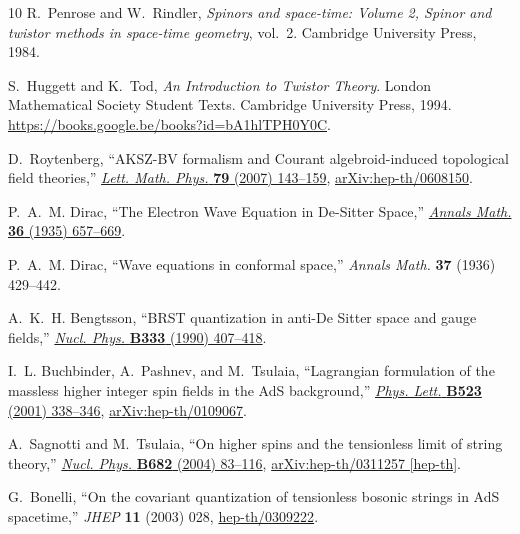 \documentclass[a4paper,12pt]{article}
\numberwithin{equation}{section} %
\numberwithin{equation}{section}
\begin{document}
\begin{thebibliography}{10}
R.~Penrose and W.~Rindler, {\em Spinors and space-time: Volume 2, Spinor and twistor methods in space-time geometry}, vol.~2.
\newblock Cambridge University Press, 1984.

S.~Huggett and K.~Tod, {\em An Introduction to Twistor Theory}.
\newblock London Mathematical Society Student Texts. Cambridge University Press, 1994.
\newblock \url{https://books.google.be/books?id=bA1hlTPH0Y0C}.

D.~Roytenberg, ``{AKSZ}-{BV} formalism and {C}ourant algebroid-induced topological field theories,'' \href{http://dx.doi.org/10.1007/s11005-006-0134-y}{{\em Lett. Math. Phys.} {\bfseries 79} (2007) 143--159},
\href{http://arxiv.org/abs/hep-th/0608150}{{\ttfamily arXiv:hep-th/0608150}}.

P.~A.~M. Dirac, ``{The Electron Wave Equation in De-Sitter Space},'' \href{http://dx.doi.org/10.2307/1968649}{{\em Annals Math.} {\bfseries 36} (1935) 657--669}.

P.~A.~M. Dirac, ``{W}ave equations in conformal space,''
{\em Annals Math.} {\bfseries 37} (1936) 429--442.

A.~K.~H. Bengtsson, ``{BRST quantization in anti-De Sitter space and gauge fields},''
\href{http://dx.doi.org/10.1016/0550-3213(90)90044-E}{{\em Nucl. Phys.} {\bfseries B333} (1990) 407--418}.

I.~L. Buchbinder, A.~Pashnev, and M.~Tsulaia, ``{L}agrangian formulation of the massless higher integer spin fields in the {A}d{S} background,'' \href{http://dx.doi.org/10.1016/S0370-2693(01)01268-0}{{\em Phys. Lett.} {\bfseries B523} (2001) 338--346},
\href{http://arxiv.org/abs/hep-th/0109067}{{\ttfamily arXiv:hep-th/0109067}}.

A.~Sagnotti and M.~Tsulaia, ``{On higher spins and the tensionless limit of string theory},'' \href{http://dx.doi.org/10.1016/j.nuclphysb.2004.01.024}{{\em Nucl. Phys.} {\bfseries B682} (2004) 83--116},
\href{http://arxiv.org/abs/hep-th/0311257}{{\ttfamily arXiv:hep-th/0311257 [hep-th]}}.

G.~Bonelli, ``{O}n the covariant quantization of tensionless bosonic strings in {AdS} spacetime,'' {\em JHEP} {\bfseries 11} (2003) 028,
\href{http://arxiv.org/abs/hep-th/0309222}{{\ttfamily hep-th/0309222}}.


\end{thebibliography}
\end{document}
